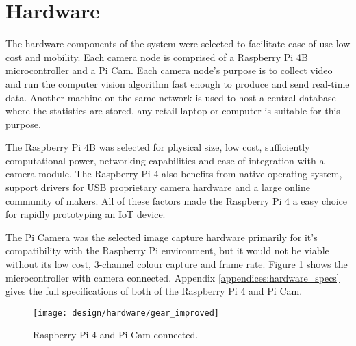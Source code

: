 \section{Hardware}


The hardware components of the system were selected to facilitate ease of use low cost and mobility. Each camera node is comprised of a Raspberry Pi 4B microcontroller and a Pi Cam. Each camera node's purpose is to collect video and run the computer vision algorithm fast enough to produce and send real-time data. Another machine on the same network is used to host a central database where the statistics are stored, any retail laptop or computer is suitable for this purpose.

The Raspberry Pi 4B was selected for physical size, low cost, sufficiently computational power, networking capabilities and ease of integration with a camera module. The Raspberry Pi 4 also benefits from native operating system, support drivers for USB proprietary camera hardware and a large online community of makers. All of these factors made the Raspberry Pi 4 a easy choice for rapidly prototyping an IoT device. 

The Pi Camera was the selected image capture hardware primarily for it's compatibility with the Raspberry Pi environment, but it would not be viable without its low cost, 3-channel colour capture and frame rate. Figure \ref{fig:raspi_gear} shows the microcontroller with camera connected. Appendix \ref{appendices:hardware_specs} gives the full specifications of both of the Raspberry Pi 4 and Pi Cam.

\begin{figure}[H]
    \centering
    \centering\texttt{[image: design/hardware/gear\_improved]}
    \caption{Raspberry Pi 4 and Pi Cam connected.}
    \label{fig:raspi_gear}
  \end{figure}
  